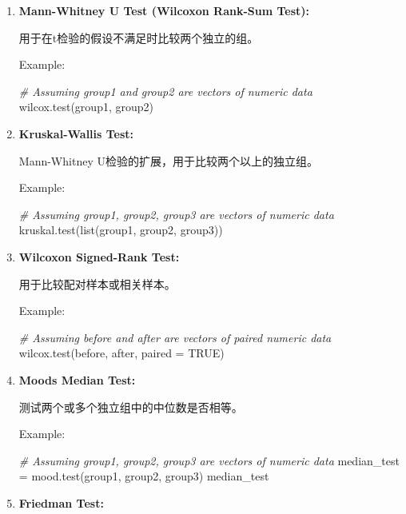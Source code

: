 \documentclass[
]{article}
\newenvironment{Shaded}{}{}
\newcommand{\AttributeTok}[1]{\textcolor[rgb]{0.49,0.56,0.16}{#1}}
\newcommand{\CommentTok}[1]{\textcolor[rgb]{0.38,0.63,0.69}{\textit{#1}}}
\newcommand{\ConstantTok}[1]{\textcolor[rgb]{0.53,0.00,0.00}{#1}}
\newcommand{\FunctionTok}[1]{\textcolor[rgb]{0.02,0.16,0.49}{#1}}
\newcommand{\NormalTok}[1]{#1}
\newcommand{\OtherTok}[1]{\textcolor[rgb]{0.00,0.44,0.13}{#1}}
\begin{document}
\begin{enumerate}
\def\labelenumi{\arabic{enumi}.}
\item
  \textbf{Mann-Whitney U Test (Wilcoxon Rank-Sum Test):}

  用于在t检验的假设不满足时比较两个独立的组。

  Example:

\begin{Shaded}
\begin{Highlighting}[]
\CommentTok{\# Assuming \textquotesingle{}group1\textquotesingle{} and \textquotesingle{}group2\textquotesingle{} are vectors of numeric data}
\FunctionTok{wilcox.test}\NormalTok{(group1, group2)}
\end{Highlighting}
\end{Shaded}
\item
  \textbf{Kruskal-Wallis Test:}

  Mann-Whitney U检验的扩展，用于比较两个以上的独立组。

  Example:

\begin{Shaded}
\begin{Highlighting}[]
\CommentTok{\# Assuming \textquotesingle{}group1\textquotesingle{}, \textquotesingle{}group2\textquotesingle{}, \textquotesingle{}group3\textquotesingle{} are vectors of numeric data}
\FunctionTok{kruskal.test}\NormalTok{(}\FunctionTok{list}\NormalTok{(group1, group2, group3))}
\end{Highlighting}
\end{Shaded}
\item
  \textbf{Wilcoxon Signed-Rank Test:}

  用于比较配对样本或相关样本。

  Example:

\begin{Shaded}
\begin{Highlighting}[]
\CommentTok{\# Assuming \textquotesingle{}before\textquotesingle{} and \textquotesingle{}after\textquotesingle{} are vectors of paired numeric data}
\FunctionTok{wilcox.test}\NormalTok{(before, after, }\AttributeTok{paired =} \ConstantTok{TRUE}\NormalTok{)}
\end{Highlighting}
\end{Shaded}
\item
  \textbf{Mood\textquotesingle s Median Test:}

  测试两个或多个独立组中的中位数是否相等。

  Example:

\begin{Shaded}
\begin{Highlighting}[]
\CommentTok{\# Assuming \textquotesingle{}group1\textquotesingle{}, \textquotesingle{}group2\textquotesingle{}, \textquotesingle{}group3\textquotesingle{} are vectors of numeric data}
\NormalTok{median\_test }\OtherTok{=} \FunctionTok{mood.test}\NormalTok{(group1, group2, group3)}
\NormalTok{median\_test}
\end{Highlighting}
\end{Shaded}
\item
  \textbf{Friedman Test:}


\end{enumerate}
\end{document}
